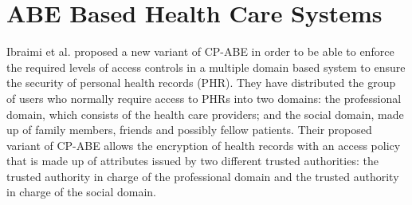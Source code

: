 


\section{ABE Based Health Care Systems}

Ibraimi et al. proposed a new variant of CP-ABE \cite{Ibraimi2010} in order to be able to enforce the required levels of access controls in a multiple domain based system to ensure the security of personal health records (PHR). They have distributed the group of users who normally require access to PHRs into two domains: the professional domain, which consists of the health care providers; and the social domain, made up of family members, friends and possibly fellow patients. Their proposed variant of CP-ABE allows the encryption of health records with an access policy that is made up of attributes issued by two different trusted authorities: the trusted authority in charge of the professional domain and the trusted authority in charge of the social domain.

